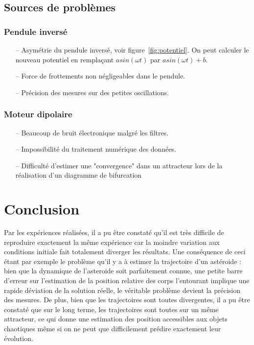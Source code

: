 \documentclass[a4paper,12pt,oneside]{article}
\begin{document}






\subsection{Sources de problèmes}

\subsubsection{Pendule inversé}
\begin{itemize}
  \item[--] Asymétrie du pendule inversé, voir figure~\ref{fig:potentiel}. On peut calculer le nouveau potentiel en remplaçant $a sin(\omega t)$ par $a sin(\omega t) + b$.
  \item[--] Force de frottements non négligeables dans le pendule.
  \item[--] Précision des mesures sur des petites oscillations.
\end{itemize}

\subsubsection{Moteur dipolaire}
\begin{itemize}
  \item[--] Beaucoup de bruit électronique malgré les filtres.
  \item[--] Impossibilité du traitement numérique des données.
  \item[--] Difficulté d'estimer une "convergence" dans un attracteur lors de la réalisation d'un diagramme de bifurcation

\end{itemize}


\section{Conclusion}

Par les expériences réalisées, il a pu être constaté qu'il est très difficile de reproduire exactement la même expérience car la moindre variation aux conditions initiale fait totalement diverger les résultats. Une conséquence de ceci étant par exemple le problème qu'il y a à estimer la trajectoire d'un astéroide : bien que la dynamique de l'asteroide soit parfaitement connue, une petite barre d'erreur sur l'estimation de la position relative des corps l'entourant implique une rapide déviation de la solution réelle, le véritable problème devient la précision des mesures. De plus, bien que les trajectoires sont toutes divergentes, il a pu être constaté que sur le long terme, les trajectoires sont toutes sur un même attracteur, ce qui donne une estimation des position accessibles aux objets chaotiques même si on ne peut que difficilement prédire exactement leur évolution.







\end{document}
